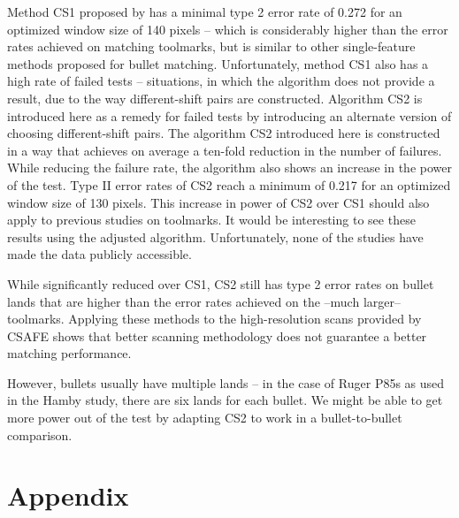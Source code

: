 \documentclass[12pt]{article}
\begin{document}
Method CS1 proposed by \citet{hadler} has a minimal type 2 error rate of
0.272 for an optimized window size of 140 pixels -- which is
considerably higher than the error rates achieved on matching toolmarks,
but is similar to other single-feature methods proposed for bullet
matching. Unfortunately, method CS1 also has a high rate of failed tests
-- situations, in which the algorithm does not provide a result, due to
the way different-shift pairs are constructed. Algorithm CS2 is
introduced here as a remedy for failed tests by introducing an alternate
version of choosing different-shift pairs. The algorithm CS2 introduced
here is constructed in a way that achieves on average a ten-fold
reduction in the number of failures. While reducing the failure rate,
the algorithm also shows an increase in the power of the test. Type II
error rates of CS2 reach a minimum of 0.217 for an optimized window size
of 130 pixels. This increase in power of CS2 over CS1 should also apply
to previous studies on toolmarks. It would be interesting to see these
results using the adjusted algorithm. Unfortunately, none of the studies
have made the data publicly accessible.

While significantly reduced over CS1, CS2 still has type 2 error rates
on bullet lands that are higher than the error rates achieved on the
--much larger-- toolmarks. Applying these methods to the high-resolution
scans provided by CSAFE shows that better scanning methodology does not
guarantee a better matching performance.

However, bullets usually have multiple lands -- in the case of Ruger
P85s as used in the Hamby study, there are six lands for each bullet. We
might be able to get more power out of the test by adapting CS2 to work
in a bullet-to-bullet comparison.

\hypertarget{appendix}{%
\section{Appendix}\label{appendix}}
\end{document}
